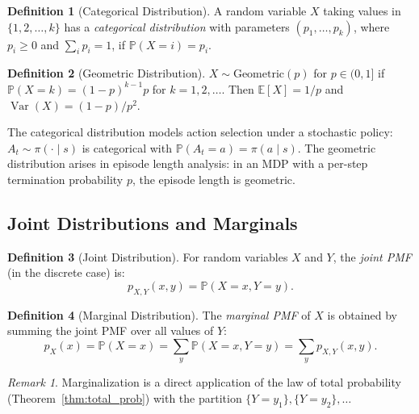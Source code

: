 \documentclass[11pt,a4paper]{article}
\theoremstyle{definition}
\newtheorem{definition}{Definition}[section]
\theoremstyle{plain}
\theoremstyle{remark}
\newtheorem{remark}{Remark}[section]
\DeclareMathOperator{\Var}{Var}
\newcommand{\E}{\mathbb{E}}
\newcommand{\Prob}{\mathbb{P}}
\begin{document}
\begin{definition}[Categorical Distribution]
\label{def:categorical}
A random variable $X$ taking values in $\{1, 2, \ldots, k\}$ has a \emph{categorical distribution} with parameters $(p_1, \ldots, p_k)$, where $p_i \geq 0$ and $\sum_i p_i = 1$, if $\Prob(X = i) = p_i$.
\end{definition}

\begin{definition}[Geometric Distribution]
\label{def:geometric}
$X \sim \text{Geometric}(p)$ for $p \in (0,1]$ if $\Prob(X = k) = (1-p)^{k-1} p$ for $k = 1, 2, \ldots$. Then $\E[X] = 1/p$ and $\Var(X) = (1-p)/p^2$.
\end{definition}

\begin{rlconnection}[Connection to RL]
The categorical distribution models action selection under a stochastic policy: $A_t \sim \pi(\cdot \mid s)$ is categorical with $\Prob(A_t = a) = \pi(a \mid s)$. The geometric distribution arises in episode length analysis: in an MDP with a per-step termination probability $p$, the episode length is geometric.
\end{rlconnection}

\subsection{Joint Distributions and Marginals}
\label{subsec:joint}

\begin{definition}[Joint Distribution]
\label{def:joint}
For random variables $X$ and $Y$, the \emph{joint PMF} (in the discrete case) is:
\begin{equation}
    p_{X,Y}(x, y) = \Prob(X = x, Y = y).
    \label{eq:joint_pmf}
\end{equation}
\end{definition}

\begin{definition}[Marginal Distribution]
\label{def:marginal}
The \emph{marginal PMF} of $X$ is obtained by summing the joint PMF over all values of $Y$:
\begin{equation}
    p_X(x) = \Prob(X = x) = \sum_y \Prob(X = x, Y = y) = \sum_y p_{X,Y}(x, y).
    \label{eq:marginal}
\end{equation}
\end{definition}

\begin{remark}
Marginalization is a direct application of the law of total probability (Theorem~\ref{thm:total_prob}) with the partition $\{Y = y_1\}, \{Y = y_2\}, \ldots$
\end{remark}
\end{document}
